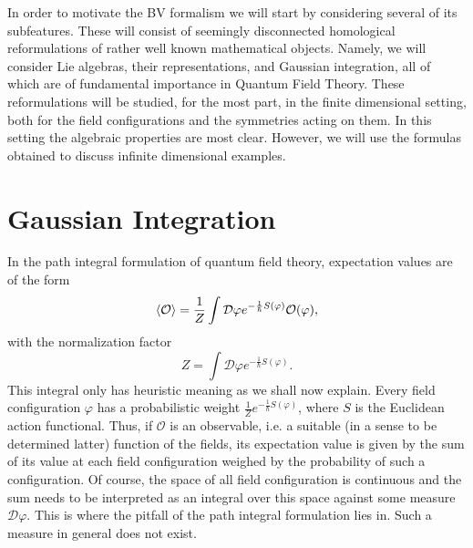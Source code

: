 In order to motivate the BV formalism we will start by considering several of its subfeatures. These will consist of seemingly disconnected homological reformulations of rather well known mathematical objects. Namely, we will consider Lie algebras, their representations, and Gaussian integration, all of which are of fundamental importance in Quantum Field Theory. These reformulations will be studied, for the most part, in the finite dimensional setting, both for the field configurations and the symmetries acting on them. In this setting the algebraic properties are most clear. However, we will use the formulas obtained to discuss infinite dimensional examples.

\section{Gaussian Integration}

In the path integral formulation of quantum field theory, expectation values are of the form
\begin{equation}\label{eq:expectation}
\ev{\mathcal{O}}=\frac{1}{Z}\int\mathcal{D}\varphi e^{-\frac{1}{\hbar}S(\varphi)}\mathcal{O}(\varphi),
\end{equation}
with the normalization factor
\begin{equation}
Z=\int\mathcal{D}\varphi e^{-\frac{1}{\hbar}S(\varphi)}.
\end{equation}
This integral only has heuristic meaning as we shall now explain. Every field configuration $\varphi$ has a probabilistic weight $\frac{1}{Z}e^{-\frac{1}{\hbar}S(\varphi)}$, where $S$ is the Euclidean action functional. Thus, if $\mathcal{O}$ is an observable, i.e. a suitable (in a sense to be determined latter) function of the fields, its expectation value is given by the sum of its value at each field configuration weighed by the probability of such a configuration. Of course, the space of all field configuration is continuous and the sum needs to be interpreted as an integral over this space against some measure $\mathcal{D}\varphi$. This is where the pitfall of the path integral formulation lies in. Such a measure in general does not exist.

